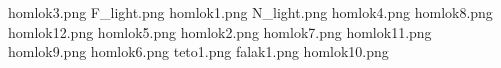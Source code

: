 homlok3.png
F_light.png
homlok1.png
N_light.png
homlok4.png
homlok8.png
homlok12.png
homlok5.png
homlok2.png
homlok7.png
homlok11.png
homlok9.png
homlok6.png
teto1.png
falak1.png
homlok10.png
